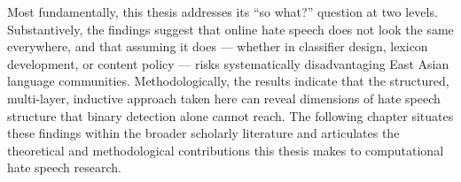 \documentclass[../CLthesis.tex]{subfiles}
\begin{document}
Most fundamentally, this thesis addresses its ``so what?'' question at two levels. Substantively, the findings suggest that online hate speech does not look the same everywhere, and that assuming it does --- whether in classifier design, lexicon development, or content policy --- risks systematically disadvantaging East Asian language communities. Methodologically, the results indicate that the structured, multi-layer, inductive approach taken here can reveal dimensions of hate speech structure that binary detection alone cannot reach. The following chapter situates these findings within the broader scholarly literature and articulates the theoretical and methodological contributions this thesis makes to computational hate speech research.

\subfilebibliography
\end{document}
